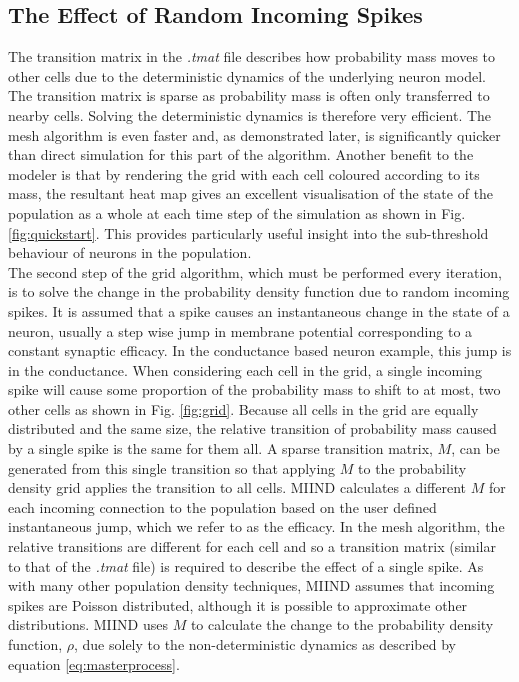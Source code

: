 \documentclass[utf8]{frontiersSCNS} %
\begin{document}
\subsection{The Effect of Random Incoming Spikes}
The transition matrix in the \textit{.tmat} file describes how probability mass moves to other cells due to the deterministic dynamics of the underlying neuron model. The transition matrix is sparse as probability mass is often only transferred to nearby cells. Solving the deterministic dynamics is therefore very efficient. The mesh algorithm is even faster and, as demonstrated later, is significantly quicker than direct simulation for this part of the algorithm. Another benefit to the modeler is that by rendering the grid with each cell coloured according to its mass, the resultant heat map gives an excellent visualisation of the state of the population as a whole at each time step of the simulation as shown in Fig. \ref{fig:quickstart}. This provides particularly useful insight into the sub-threshold behaviour of neurons in the population.\\ 

The second step of the grid algorithm, which must be performed every iteration, is to solve the change in the probability density function due to random incoming spikes. It is assumed that a spike causes an instantaneous change in the state of a neuron, usually a step wise jump in membrane potential corresponding to a constant synaptic efficacy. In the conductance based neuron example, this jump is in the conductance. When considering each cell in the grid, a single incoming spike will cause some proportion of the probability mass to shift to at most, two other cells as shown in Fig. \ref{fig:grid}. Because all cells in the grid are equally distributed and the same size, the relative transition of probability mass caused by a single spike is the same for them all. A sparse transition matrix, $M$, can be generated from this single transition so that applying $M$ to the probability density grid applies the transition to all cells. MIIND calculates a different $M$ for each incoming connection to the population based on the user defined instantaneous jump, which we refer to as the efficacy. In the mesh algorithm, the relative transitions are different for each cell and so a transition matrix (similar to that of the \textit{.tmat} file) is required to describe the effect of a single spike. As with many other population density techniques, MIIND assumes that incoming spikes are Poisson distributed, although it is possible to approximate other distributions. MIIND uses $M$ to calculate the change to the probability density function, $\rho$, due solely to the non-deterministic dynamics as described by equation \ref{eq:masterprocess}.
\end{document}
